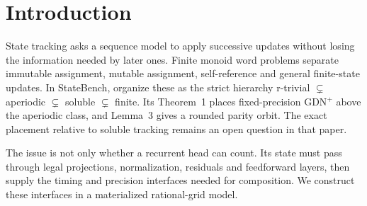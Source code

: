 \documentclass[10pt]{article}
\theoremstyle{remark}
\begin{document}
\section{Introduction}

State tracking asks a sequence model to apply successive updates without
losing the information needed by later ones. Finite monoid word problems
separate immutable assignment, mutable assignment, self-reference and general
finite-state updates. In StateBench, \citet{statebench} organize these as the
strict hierarchy r-trivial $\subsetneq$ aperiodic $\subsetneq$ soluble
$\subsetneq$ finite. Its Theorem~1 places fixed-precision GDN$^+$ above the
aperiodic class, and Lemma~3 gives a rounded parity orbit. The exact placement
relative to soluble tracking remains an open question in that paper.

The issue is not only whether a recurrent head can count. Its state must pass
through legal projections, normalization, residuals and feedforward layers,
then supply the timing and precision interfaces needed for composition. We
construct these interfaces in a materialized rational-grid model.
\end{document}

